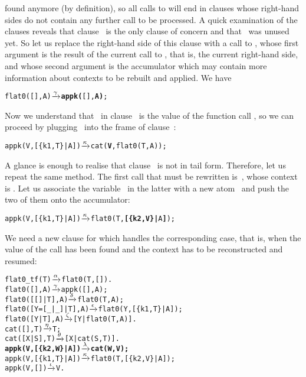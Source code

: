 found anymore (by definition), so all calls to  will
end in clauses whose right\hyp{}hand sides do not contain any further
call to be processed. A quick examination of the clauses reveals that
clause~\clause{\gamma} is the only clause of concern and that
~was unused yet. So let us replace the right\hyp{}hand side
of this clause with a call to , whose first argument is
the result of the current call to , that is, the
current right\hyp{}hand side, and whose second argument is the
accumulator which may contain more information about contexts to be
rebuilt and applied. We have
\begin{alltt}
flat0(       [],A) \(\smashedrightarrow{\gamma}\) \textbf{appk(}[],\textbf{A)};
\end{alltt}
Now we understand that~ in clause~\clause{\kappa} is the
value of the function call , so we can
proceed by plugging~ into the frame of
clause~\clause{\kappa}:
\begin{alltt}
appk(V,[\{k1,T\}|A]) \(\smashedrightarrow{\kappa}\) cat(\textbf{V},flat0(T,A));
\end{alltt}
A glance is enough to realise that clause~\clause{\kappa} is not in tail
form. Therefore, let us repeat the same method. The first call that
must be rewritten is~, whose context is
. Let us associate the
variable~ in the latter with a new atom~ and
push the two of them onto the accumulator:
\begin{alltt}
appk(V,[\{k1,T\}|A]) \(\smashedrightarrow{\kappa}\) flat0(T,\textbf{[\{k2,V\}|}A\textbf{]});
\end{alltt}
We need a new clause for  which handles the
corresponding case, that is, when the value of the call has been found
and the context has to be reconstructed and resumed:
\begin{alltt}
flat0\_tf(T)          \(\smashedrightarrow{\alpha}\) flat0(T,[]).
flat0(         [],A) \(\smashedrightarrow{\gamma}\) appk([],A);
flat0(     [[]|T],A) \(\smashedrightarrow{\delta}\) flat0(T,A);
flat0([Y=[\_|\_]|T],A) \(\smashedrightarrow{\epsilon}\) flat0(Y,[\{k1,T\}|A]);
flat0(      [Y|T],A) \(\smashedrightarrow{\zeta}\) [Y|flat0(T,A)].
cat(   [],T)         \(\smashedrightarrow{\eta}\) T;
cat([X|S],T)         \(\smashedrightarrow{\theta}\) [X|cat(S,T)].
\textbf{appk(V,[\{k2,W\}|A])   \(\smashedrightarrow{\lambda}\) cat(W,V);}\hfill% A \emph{unused yet}
appk(V,[\{k1,T\}|A])   \(\smashedrightarrow{\kappa}\) flat0(T,[\{k2,V\}|A]);
appk(V,        [])   \(\smashedrightarrow{\iota}\) V.
\end{alltt}
